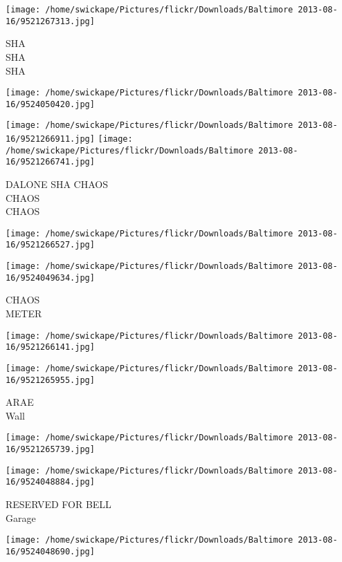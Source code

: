 \documentclass[10pt,letterpaper]{article}
\begin{document}
\texttt{[image: /home/swickape/Pictures/flickr/Downloads/Baltimore 2013-08-16/9521267313.jpg]}

SHA\\
SHA\\
SHA\\
\pagebreak

\texttt{[image: /home/swickape/Pictures/flickr/Downloads/Baltimore 2013-08-16/9524050420.jpg]}

\vspace{0.25in}
\texttt{[image: /home/swickape/Pictures/flickr/Downloads/Baltimore 2013-08-16/9521266911.jpg]}
\texttt{[image: /home/swickape/Pictures/flickr/Downloads/Baltimore 2013-08-16/9521266741.jpg]}

DALONE SHA CHAOS\\
CHAOS\\
CHAOS\\
\pagebreak

\texttt{[image: /home/swickape/Pictures/flickr/Downloads/Baltimore 2013-08-16/9521266527.jpg]}

\vspace{0.25in}
\texttt{[image: /home/swickape/Pictures/flickr/Downloads/Baltimore 2013-08-16/9524049634.jpg]}

CHAOS\\
METER\\
\pagebreak

\texttt{[image: /home/swickape/Pictures/flickr/Downloads/Baltimore 2013-08-16/9521266141.jpg]}

\vspace{0.25in}
\texttt{[image: /home/swickape/Pictures/flickr/Downloads/Baltimore 2013-08-16/9521265955.jpg]}

ARAE\\
Wall\\
\pagebreak

\texttt{[image: /home/swickape/Pictures/flickr/Downloads/Baltimore 2013-08-16/9521265739.jpg]}

\vspace{0.25in}
\texttt{[image: /home/swickape/Pictures/flickr/Downloads/Baltimore 2013-08-16/9524048884.jpg]}

RESERVED FOR BELL\\
Garage\\
\pagebreak

\texttt{[image: /home/swickape/Pictures/flickr/Downloads/Baltimore 2013-08-16/9524048690.jpg]}
\end{document}

